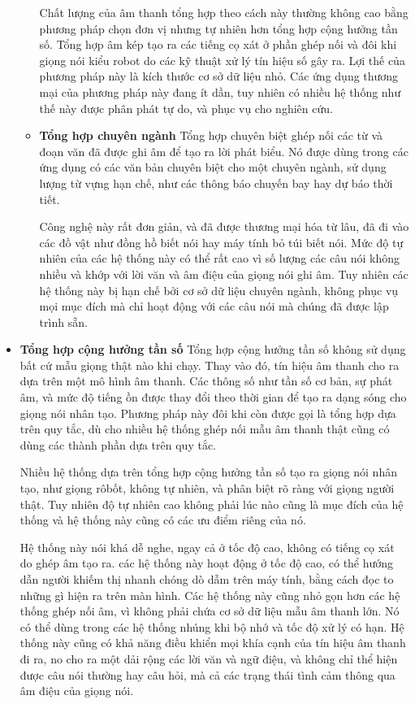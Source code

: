 \begin{itemize}
\begin{itemize}
Chất lượng của âm thanh tổng hợp theo cách này thường không cao bằng phương pháp chọn đơn vị nhưng tự nhiên hơn tổng hợp cộng hưởng tần số. Tổng hợp âm kép tạo ra các tiếng cọ xát ở phần ghép nối và đôi khi giọng nói kiểu robot do các kỹ thuật xử lý tín hiệu số gây ra. Lợi thế của phương pháp này là kích thước cơ sở dữ liệu nhỏ. Các ứng dụng thương mại của phương pháp này đang ít dần, tuy nhiên có nhiều hệ thống như thế này được phân phát tự do, và phục vụ cho nghiên cứu.

\item \textbf{Tổng hợp chuyên ngành}
Tổng hợp chuyên biệt ghép nối các từ và đoạn văn đã được ghi âm để tạo ra lời phát biểu. Nó được dùng trong các ứng dụng có các văn bản chuyên biệt cho một chuyên ngành, sử dụng lượng từ vựng hạn chế, như các thông báo chuyến bay hay dự báo thời tiết.

Công nghệ này rất đơn giản, và đã được thương mại hóa từ lâu, đã đi vào các đồ vật như đồng hồ biết nói hay máy tính bỏ túi biết nói. Mức độ tự nhiên của các hệ thống này có thể rất cao vì số lượng các câu nói không nhiều và khớp với lời văn và âm điệu của giọng nói ghi âm. Tuy nhiên các hệ thống này bị hạn chế bởi cơ sở dữ liệu chuyên ngành, không phục vụ mọi mục đích mà chỉ hoạt động với các câu nói mà chúng đã được lập trình sẵn.
\end{itemize}

\item \textbf{Tổng hợp cộng hưởng tần số}
Tổng hợp cộng hưởng tần số không sử dụng bất cứ mẫu giọng thật nào khi chạy. Thay vào đó, tín hiệu âm thanh cho ra dựa trên một mô hình âm thanh. Các thông số như tần số cơ bản, sự phát âm, và mức độ tiếng ồn được thay đổi theo thời gian để tạo ra dạng sóng cho giọng nói nhân tạo. Phương pháp này đôi khi còn được gọi là tổng hợp dựa trên quy tắc, dù cho nhiều hệ thống ghép nối mẫu âm thanh thật cũng có dùng các thành phần dựa trên quy tắc.

Nhiều hệ thống dựa trên tổng hợp cộng hưởng tần số tạo ra giọng nói nhân tạo, như giọng rôbốt, không tự nhiên, và phân biệt rõ ràng với giọng người thật. Tuy nhiên độ tự nhiên cao không phải lúc nào cũng là mục đích của hệ thống và hệ thống này cũng có các ưu điểm riêng của nó.

Hệ thống này nói khá dễ nghe, ngay cả ở tốc độ cao, không có tiếng cọ xát do ghép âm tạo ra. các hệ thống này hoạt động ở tốc độ cao, có thể hướng dẫn người khiếm thị nhanh chóng dò dẫm trên máy tính, bằng cách đọc to những gì hiện ra trên màn hình. Các hệ thống này cũng nhỏ gọn hơn các hệ thống ghép nối âm, vì không phải chứa cơ sở dữ liệu mẫu âm thanh lớn. Nó có thể dùng trong các hệ thống nhúng khi bộ nhớ và tốc độ xử lý có hạn. Hệ thống này cũng có khả năng điều khiển mọi khía cạnh của tín hiệu âm thanh đi ra, no cho ra một dải rộng các lời văn và ngữ điệu, và không chỉ thể hiện được câu nói thường hay câu hỏi, mà cả các trạng thái tình cảm thông qua âm điệu của giọng nói.


\end{itemize}
